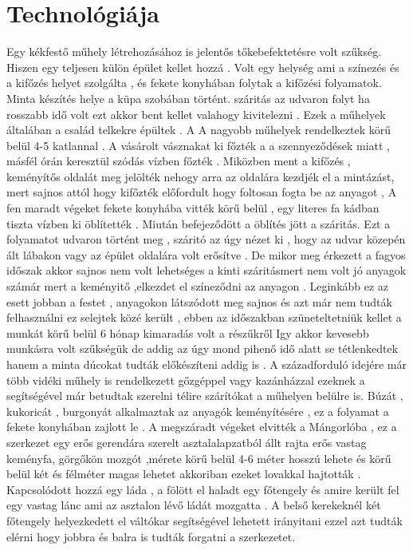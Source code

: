 \documentclass[fontsize=12pt, appendixprefix=true]{scrreprt}
\begin{document}
\section{Technológiája}
Egy kékfestő műhely létrehozásához is jelentős tőkebefektetésre volt szűkség.
  Hiszen egy teljesen külön épület kellet hozzá .
Volt egy helység ami a színezés és a kifőzés helyet szolgálta , és  fekete konyhában folytak a kifőzési folyamatok.
Minta készítés helye a küpa szobában történt.
száritás az udvaron folyt ha rosszabb  idő volt ezt akkor bent kellet valahogy kivitelezni .
 Ezek a műhelyek általában   a család telkekre épültek  . 
 A A nagyobb műhelyek rendelkeztek körű belül 4-5 katlannal .
 A vásárolt vásznakat  ki főzték a a szennyeződések miatt , másfél órán keresztül szódás vízben főzték .
 Miközben ment a kifőzés ,  keményítős oldalát meg jelölték nehogy arra az oldalára kezdjék el a mintázást, mert sajnos attól hogy kifőzték előfordult hogy foltosan fogta be az anyagot ,
 A fen maradt végeket fekete konyhába vitték  körű belül , egy literes fa kádban tiszta vízben ki öblítették .
 Miután befejeződött a öblítés jött a száritás.
 Ezt a folyamatot udvaron történt meg , száritó az úgy nézet ki , hogy  az udvar közepén ált lábakon  vagy az épület oldalára volt erősítve . De mikor meg érkezett a fagyos időszak akkor sajnos nem volt lehetséges a kinti száritásmert nem volt jó anyagok számár mert  a keményitő  ,elkezdet el színeződni az anyagon  .
 Leginkább ez az esett jobban a festet , anyagokon látszódott meg sajnos és azt már nem tudták felhasználni ez selejtek közé került ,
  ebben az időszakban szüneteltetniük  kellet a munkát körű belül 6 hónap kimaradás volt a részűkről
Igy akkor kevesebb munkásra volt szűkségük de addig az úgy mond pihenő idő  alatt se tétlenkedtek hanem a minta dúcokat tudták előkészíteni addig is .
 A századforduló idejére már több vidéki műhely is rendelkezett gőzgéppel vagy kazánházzal ezeknek a segítségével már betudtak szerelni télire szárítókat  a műhelyen belülre is.
   Búzát , kukoricát  , burgonyát alkalmaztak az anyagók keményítésére , ez a folyamat a fekete konyhában zajlott le .
 A megszáradt végeket elvitték a Mángorlóba , ez a  szerkezet  egy erős gerendára szerelt asztalalapzatból állt  rajta erős vastag keményfa, görgőkön mozgót ,mérete körű belül 4-6 méter hosszú lehete és körű belül két és félméter magas lehetet
 akkoriban ezeket lovakkal hajtották .
 Kapcsolódott hozzá egy láda ,  a fölött  el haladt egy főtengely és amire  került fel egy vastag lánc ami az asztalon lévő ládát mozgatta .
 A belső kerekeknél két főtengely helyezkedett el váltókar segítségével lehetett irányitani ezzel azt tudták elérni hogy jobbra és balra is tudták forgatni a szerkezetet.
\end{document}
